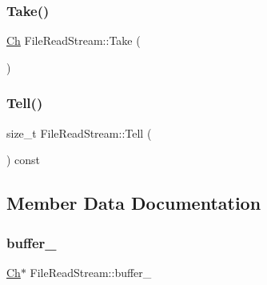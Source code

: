 \mbox{\label{classFileReadStream_addcbccc9d86ccbbe6d8e876ba595dbcb}} 
\subsubsection{\texorpdfstring{Take()}{Take()}}
{\footnotesize\ttfamily \hyperlink{classFileReadStream_ae1f83d9ca3c76d1d151af0b6c427f046}{Ch} File\+Read\+Stream\+::\+Take (\begin{DoxyParamCaption}{ }\end{DoxyParamCaption})\hspace{0.3cm}{\ttfamily [inline]}}

\mbox{\label{classFileReadStream_ae82cfaafe347286b3af8976548bedf86}} 
\subsubsection{\texorpdfstring{Tell()}{Tell()}}
{\footnotesize\ttfamily size\+\_\+t File\+Read\+Stream\+::\+Tell (\begin{DoxyParamCaption}{ }\end{DoxyParamCaption}) const\hspace{0.3cm}{\ttfamily [inline]}}



\subsection{Member Data Documentation}
\mbox{\label{classFileReadStream_a1b5563bcaa959d95f9bc3511a73ebbad}} 
\subsubsection{\texorpdfstring{buffer\+\_\+}{buffer\_}}
{\footnotesize\ttfamily \hyperlink{classFileReadStream_ae1f83d9ca3c76d1d151af0b6c427f046}{Ch}$\ast$ File\+Read\+Stream\+::buffer\+\_\+\hspace{0.3cm}{\ttfamily [private]}}

